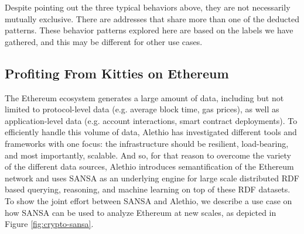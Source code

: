 Despite pointing out the three typical behaviors above, they are not necessarily mutually exclusive.
There are addresses that share more than one of the deducted patterns.
These behavior patterns explored here are based on the labels we have gathered, and this may be different for other use cases.


\subsection{Profiting From Kitties on Ethereum}
\label{sec:kitties-use-case}
The Ethereum ecosystem generates a large amount of data, including but not limited to protocol-level data (e.g. average block time, gas prices), as well as application-level data (e.g. account interactions, smart contract deployments). 
To efficiently handle this volume of data, Alethio has investigated different tools and frameworks with one focus: the infrastructure should be resilient, load-bearing, and most importantly, scalable.
And so, for that reason to overcome the variety of the different data sources, Alethio introduces semantification of the Ethereum network and uses SANSA as an underlying engine for large scale distributed \gls{RDF} based querying, reasoning, and machine learning on top of these \gls{RDF} datasets.
To show the joint effort between SANSA and Alethio, we describe a use case on how SANSA can be used to analyze Ethereum at new scales, as depicted in Figure \ref{fig:crypto-sansa}. 


